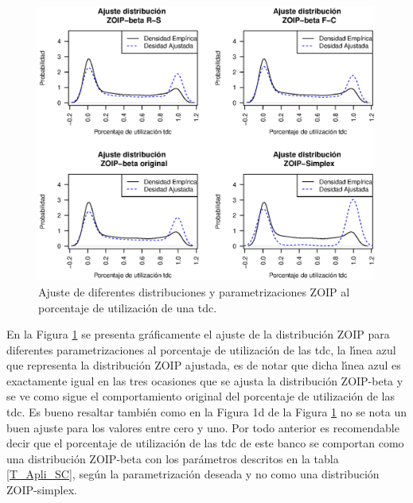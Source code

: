 \begin{figure}
	\begin{center}
		\includegraphics[scale=0.55]{Aplicacion_SC.eps}
		\caption{Ajuste de diferentes distribuciones y parametrizaciones ZOIP al porcentaje de utilizaci\'{o}n de una tdc.}
		\label{Apli_Aju_ZOIP}
	\end{center}
\end{figure}


En la Figura \ref{Apli_Aju_ZOIP} se presenta gr\'{a}ficamente el ajuste de la distribuci\'{o}n ZOIP para diferentes parametrizaciones al porcentaje de utilizaci\'{o}n de las tdc, la l\'{\i}nea azul que representa la distribuci\'{o}n ZOIP ajustada, es de notar que dicha l\'{\i}nea azul es exactamente igual en las tres ocasiones que se ajusta la distribuci\'{o}n ZOIP-beta y se ve como sigue el comportamiento original del porcentaje de utilizaci\'{o}n de las tdc. Es bueno resaltar tambi\'{e}n como en la Figura 1d de la Figura \ref{Apli_Aju_ZOIP} no se nota un buen ajuste para los valores entre cero y uno. Por todo anterior es recomendable decir que el porcentaje de utilizaci\'{o}n de las tdc de este banco se comportan como una distribuci\'{o}n ZOIP-beta con los par\'{a}metros descritos en la tabla \ref{T_Apli_SC}, seg\'{u}n la parametrizaci\'{o}n deseada y no como una distribuci\'{o}n ZOIP-simplex.



